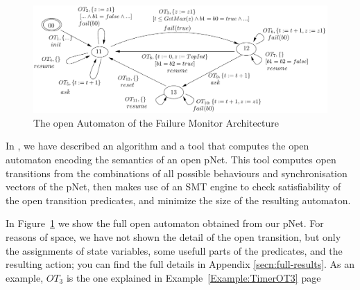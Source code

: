 \documentclass{llncs}
\newcommand{\todoEM}[2][color=blue!40, size=\tiny]{\todo[#1]{\textbf{To-do Eric:} {#2}}}
\begin{document}

\begin{figure}[t]
  \centering
  \includegraphics[width=0.9\columnwidth]{TimerOADetailed}
  \caption{The open Automaton of the Failure Monitor Architecture}
  \label{schema:ArchFailure:OA}
\end{figure}

In \cite{HMZ-FORTE2016QBMZ-AVOCS18}, we have described an algorithm
and a tool that 
computes the open automaton encoding the semantics of an open
pNet. This tool computes open transitions from the combinations of all
possible behaviours and synchronisation vectors of the pNet, then makes
use of an SMT engine to check satisfiability of the open transition
predicates, and minimize the size of the resulting automaton.



In Figure~\ref{schema:ArchFailure:OA} we show the full open automaton
obtained from our pNet. For reasons of space, we have not shown the
detail of the open transition, but only the assignments of state
variables, some usefull parts of the predicates, and the resulting
action; you can find the full details in 
Appendix \ref{secn:full-results}. As an example, $OT_3$ is the one
explained in Example~\ref{Example:TimerOT3} page~\pageref{Example:TimerOT3}
\end{document}
